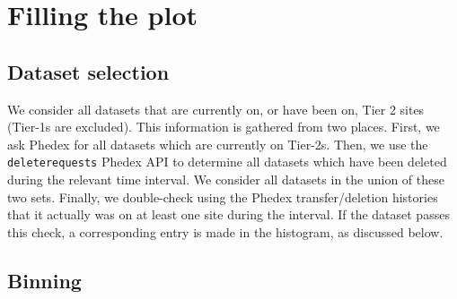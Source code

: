 \section{Filling the plot}

\subsection{Dataset selection}

We consider all datasets that are currently on, or have been on, Tier 2 sites
(Tier-1s are excluded). This information is gathered from two places. First, we
ask Phedex for all datasets which are currently on Tier-2s. Then, we use the
\verb|deleterequests| Phedex API to determine all datasets which have been
deleted during the relevant time interval. We consider all datasets in the union
of these two sets. Finally, we double-check using the Phedex transfer/deletion
histories that it actually was on at least one site during the interval. If the
dataset passes this check, a corresponding entry is made in the histogram, as
discussed below.

\subsection{Binning}

